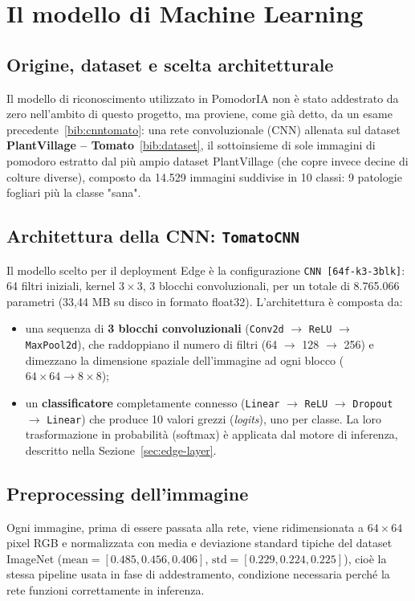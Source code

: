 \section{Il modello di Machine Learning}
\label{sec:modello-ml}

\subsection{Origine, dataset e scelta architetturale}

Il modello di riconoscimento utilizzato in PomodorIA non è stato addestrato
da zero nell'ambito di questo progetto, ma proviene, come già detto, da un esame
precedente~\ref{bib:cnntomato}: una rete convoluzionale (CNN) allenata sul
dataset \textbf{PlantVillage -- Tomato}~\ref{bib:dataset}, il sottoinsieme
di sole immagini di pomodoro estratto dal più ampio dataset PlantVillage
(che copre invece decine di colture diverse), composto da 14.529 immagini
suddivise in 10 classi: 9 patologie fogliari più la classe "sana".

\subsection{Architettura della CNN: \texttt{TomatoCNN}}

Il modello scelto per il deployment Edge è la configurazione
\texttt{CNN~[64f-k3-3blk]}: 64 filtri iniziali, kernel $3\times3$, 3 blocchi
convoluzionali, per un totale di 8.765.066 parametri (33,44 MB su disco in
formato float32). L'architettura è composta da:

\begin{itemize}
    \item una sequenza di \textbf{3 blocchi convoluzionali} (\texttt{Conv2d}
    $\to$ \texttt{ReLU} $\to$ \texttt{MaxPool2d}), che raddoppiano il numero
    di filtri (64 $\to$ 128 $\to$ 256) e dimezzano la dimensione spaziale
    dell'immagine ad ogni blocco ($64\times64 \to 8\times8$);
    \item un \textbf{classificatore} completamente connesso
    (\texttt{Linear} $\to$ \texttt{ReLU} $\to$ \texttt{Dropout} $\to$
    \texttt{Linear}) che produce 10 valori grezzi (\emph{logits}), uno per
    classe. La loro trasformazione in probabilità (softmax) è applicata
    dal motore di inferenza, descritto nella Sezione~\ref{sec:edge-layer}.
\end{itemize}

\subsection{Preprocessing dell'immagine}

Ogni immagine, prima di essere passata alla rete, viene ridimensionata a
$64\times64$ pixel RGB e normalizzata con media e deviazione standard
tipiche del dataset ImageNet ($\text{mean}=[0.485, 0.456, 0.406]$,
$\text{std}=[0.229, 0.224, 0.225]$), cioè la stessa pipeline usata in fase di
addestramento, condizione necessaria perché la rete funzioni correttamente
in inferenza.
